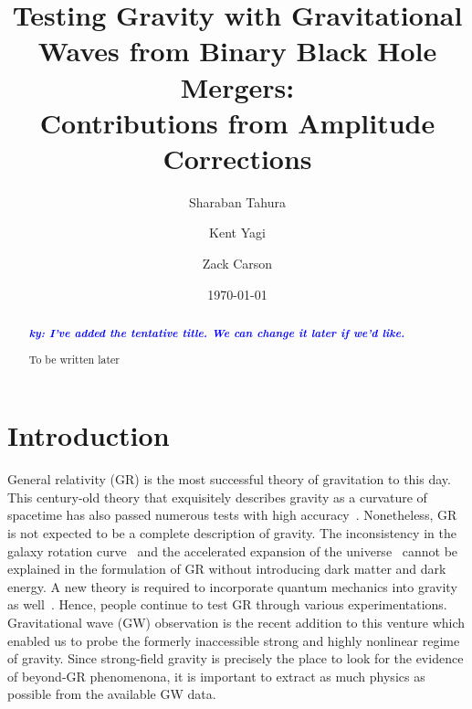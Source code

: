 \documentclass[prd,twocolumn,nofootinbib]{revtex4-1}
\newcommand{\ky}[1]{\textcolor{blue}{\it{\textbf{ky: #1}}} }
\begin{document}
\title{Testing Gravity with Gravitational Waves from Binary Black Hole Mergers: \\ Contributions from Amplitude Corrections}

\author{Sharaban Tahura}

\author{Kent Yagi}

\author{Zack Carson}

\begin{abstract}

\ky{I've added the tentative title. We can change it later if we'd like.}



To be written later
\end{abstract}

\date{\today}




\maketitle




\section{Introduction}
General relativity (GR) is the most successful theory of gravitation to this day. This century-old theory that exquisitely describes gravity as a curvature of spacetime has also passed numerous tests with high accuracy~\cite{Will:2014kxa}. Nonetheless, GR is not expected to be a complete description of gravity. The inconsistency in the galaxy rotation curve~\cite{article,Bosma:1981zz,Begeman:1991iy,Rubin:1970zza,Rubin:1980zd,1973ApJ...186..467O,Ostriker:1993fr} and the accelerated expansion of the universe~\cite{Abbott:1988nx,Copeland:2006wr,Perlmutter:1998np,Riess:1998cb,Riess:2004nr,RevModPhys.61.1,vanAlbada:1984js,WEINBERG201387}  cannot be explained in the formulation of GR without introducing dark matter and dark energy. A new theory is required to incorporate quantum mechanics into gravity as well~\cite{Adler:2010wf,Ng:2003jk}. Hence, people continue to test GR through various experimentations. Gravitational wave (GW) observation is the recent addition to this venture which enabled us to probe the formerly inaccessible strong and highly nonlinear regime of gravity. Since strong-field gravity is precisely the place to look for the evidence of beyond-GR phenomenona, it is important to extract as much physics as possible from the available GW data. 
\end{document}
